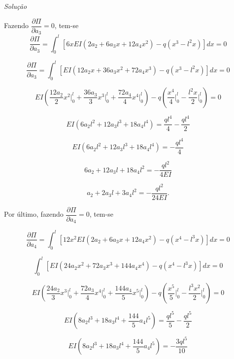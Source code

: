 \documentclass[
	12pt,				%
	openright,			%
    twoside,			%
	a4paper,			%
	chapter=TITLE,		%
	english,			%
	french,				%
	spanish,			%
	brazil				%
	]{abntex2}
\makeatletter
\renewenvironment{proof}[1][\proofname]{
	\par\pushQED{\qed}%
	\normalfont \topsep6\p@\@plus6\p@\relax
	\trivlist
	\item\relax
		{\itshape
			#1\@addpunct{.}}\hspace\labelsep\ignorespaces
}{%
	\popQED\endtrivlist\@endpefalse
}
\newenvironment{solution}{
	\begin{proof}[Solução]
}{%
	\end{proof}
}
\numberwithin{lema}{chapter}
\numberwithin{teorema}{chapter}
\numberwithin{definicao}{chapter}
\numberwithin{exemplo}{chapter}
\numberwithin{figure}{chapter}
\makeatother
\begin{document}
\begin{solution}
	Fazendo $\dfrac{\partial \Pi}{\partial a_3} = 0$, tem-se
	\begin{equation}
		\label{eqn:cap_metodo_ray_ritz:exemp_v3_diff_a3}
		\frac{\partial \Pi}{\partial a_3}
		=
		\int_0^l \left [
			6xEI(2a_2 + 6a_3x + 12a_4x^2)
			-
			q(x^3 - l^2x)
		\right ] dx
		= 0
	\end{equation}
	
	$$
		\frac{\partial \Pi}{\partial a_3}
		=
		\int_0^l \left [
			EI(12 a_2 x + 36 a_3 x^2 + 72 a_4 x^3)
			-
			q(x^3-l^2x)
		\right ] dx
		= 0
	$$
	
	$$
		EI \left (
			\frac{12a_2}{2} x^2 \Big |_0^l
			+
			\frac{36a_3}{3} x^3 \Big |_0^l
			+
			\frac{72a_4}{4} x^4 \Big |_0^l
		\right )
		-
		q \left (
			\frac{x^4}{4} \Big |_0^l
			-
			\frac{l^2 x}{2} \Big |_0^l
		\right )
		= 0
	$$
	
	$$
		EI(6a_2 l^2 + 12a_3 l^3 + 18a_4 l^4)
		=
		\frac{ql^4}{4}
		-
		\frac{ql^4}{2}
	$$
	
	$$
		EI(6a_2 l^2 + 12a_3 l^3 + 18a_4 l^4)
		=
		-\frac{ql^4}{4}
	$$
	
	$$
		6a_2 + 12a_3 l + 18a_4 l^2
		=
		-\frac{ql^2}{4EI}
	$$
	
	\begin{equation}
		\label{eq:exemp_rayritz_approx3_eq2}
		a_2 + 2a_3 l + 3a_4 l^2 = - \frac{ql^2}{24EI}
		\text{.}
	\end{equation}
	
	Por último, fazendo $\dfrac{\partial \Pi}{\partial a_4}=0$, tem-se
	
	\begin{equation}
		\label{eqn:cap_metodo_ray_ritz:exemp_v3_diff_a4}
		\frac{\partial \Pi}{\partial a_4}
		=
		\int_0^l \left [
			12x^2EI(2a_2 + 6a_3x + 12a_4x^2)
			-
			q(x^4 - l^3x)
		\right ] dx
		= 0
	\end{equation}
	
	$$
		\int_0^l \left [
			EI(24a_2 x^2 + 72 a_3 x^3 + 144 a_4 x^4)
			-
			q(x^4 - l^3 x)
		\right ] dx
		= 0
	$$
	
	$$
		EI \left ( 
			\frac{24a_2}{3}x^3 \Big |_0^l
			+
			\frac{72a_3}{4}x^4 \Big |_0^l
			+
			\frac{144a_4}{5}x^5 \Big |_0^l
		\right )
		-
		q \left (
			\frac{x^5}{5} \Big |_0^l
			-
			\frac{l^3x^2}{2} \Big |_0^l
		\right )
		= 0
	$$
	
	$$
		EI \left (
			8a_2 l^3 + 18 a_3 l^4 + \frac{144}{5} a_4 l^5
		\right )
		=
		\frac{ql^5}{5}
		-
		\frac{ql^5}{2}
	$$
	
	$$
		EI \left (
			8a_2 l^3 + 18 a_3 l^4 + \frac{144}{5} a_4 l^5
		\right )
		=
		-\frac{3ql^5}{10}
	$$
	

\end{solution}
\end{document}
